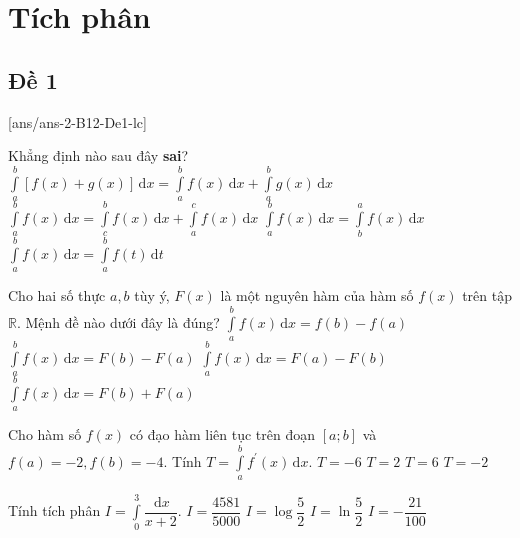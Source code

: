 \section{Tích phân}
\subsection{Đề 1}
[ans/ans-2-B12-De1-lc]
\caulc
\begin{ex}%
    Khẳng định nào sau đây \textbf{sai}?
    \choice 
        {$\displaystyle\int\limits_a^b[f(x)+g(x)] \mathrm{\,d}x=\displaystyle\int\limits_a^b f(x) \mathrm{\,d}x+\displaystyle\int\limits_a^b g(x) \mathrm{\,d}x$}
        {$\displaystyle\int\limits_a^b f(x) \mathrm{\,d}x=\displaystyle\int\limits_c^b f(x) \mathrm{\,d}x+\displaystyle\int\limits_a^c f(x) \mathrm{\,d}x$}
        {\True $\displaystyle\int\limits_a^b f(x)\mathrm{\,d}x=\displaystyle\int\limits_b^a f(x) \mathrm{\,d}x$}
        {$\displaystyle\int\limits_a^b f(x) \mathrm{\,d}x=\displaystyle\int\limits_a^b f(t) \mathrm{\,d}t$}
\end{ex}

\begin{ex}%
     Cho hai số thực $a, b$ tùy ý, $F(x)$ là một nguyên hàm của hàm số $f(x)$ trên tập $\mathbb{R}$. Mệnh đề nào dưới đây là đúng?
     \choice
        {$\displaystyle\int\limits_a^b f(x) \mathrm{\,d}x=f(b)-f(a)$}
        {\True $\displaystyle\int\limits_a^b f(x) \mathrm{\,d}x=F(b)-F(a)$}
        {$\displaystyle\int\limits_a^b f(x) \mathrm{\,d}x=F(a)-F(b)$}
        {$\displaystyle\int\limits_a^b f(x) \mathrm{\,d}x=F(b)+F(a)$}
\end{ex}

\begin{ex}%
    Cho hàm số $f(x)$ có đạo hàm liên tục trên đoạn $[a ; b]$ và $f(a)=-2, f(b)=-4$. Tính $T=\displaystyle\int\limits_a^b f^{\prime}(x) \mathrm{\,d}x$.
    \choice 
        {$T=-6$}
        {$T=2$}
        {$T=6$}
        {\True $T=-2$}
\end{ex}

\begin{ex}%
    Tính tích phân $I=\displaystyle\int\limits_0^3 \dfrac{\mathrm{\,d}x}{x+2}$.
    \choice 
     {$I=\dfrac{4581}{5000}$}
     {$I=\log \dfrac{5}{2}$}
     {\True $I=\ln \dfrac{5}{2}$}
     {$I=-\dfrac{21}{100}$}
\end{ex}

